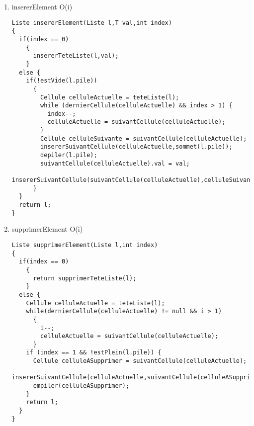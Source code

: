 \documentclass[11pt]{article}
\begin{document}
\begin{enumerate}
\begin{lstlisting}
}
\end{lstlisting}
\item insererElement O(i)
\label{sec:org80c0aa4}

\begin{lstlisting}
Liste insererElement(Liste l,T val,int index)
{
  if(index == 0)
    {
      insererTeteListe(l,val);
    }
  else {
    if(!estVide(l.pile))
      {
        Cellule celluleActuelle = teteListe(l);
        while (dernierCellule(celluleActuelle) && index > 1) {
          index--;
          celluleActuelle = suivantCellule(celluleActuelle);
        }
        Cellule celluleSuivante = suivantCellule(celluleActuelle);
        insererSuivantCellule(celluleActuelle,sommet(l.pile));
        depiler(l.pile);
        suivantCellule(celluleActuelle).val = val;
        insererSuivantCellule(suivantCellule(celluleActuelle),celluleSuivante);
      }
  }
  return l;
}
\end{lstlisting}
\item supprimerElement O(i)
\label{sec:org0ebf983}

\begin{lstlisting}
Liste supprimerElement(Liste l,int index)
{
  if(index == 0)
    {
      return supprimerTeteListe(l);
    }
  else {
    Cellule celluleActuelle = teteListe(l);
    while(dernierCellule(celluleActuelle) != null && i > 1)
      {
        i--;
        celluleActuelle = suivantCellule(celluleActuelle);
      }
    if (index == 1 && !estPlein(l.pile)) {
      Cellule celluleASupprimer = suivantCellule(celluleActuelle);
      insererSuivantCellule(celluleActuelle,suivantCellule(celluleASupprimer));
      empiler(celluleASupprimer);
    }
    return l;
  }
}
\end{lstlisting}
\end{enumerate}
\end{document}
